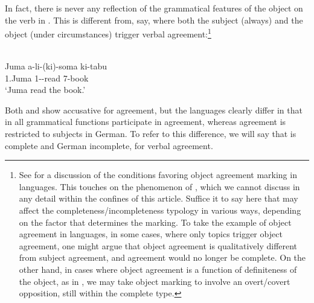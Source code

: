 \documentclass[output=paper]{langsci/langscibook}
\begin{document}
In fact, there is never any reflection of the grammatical features of the
object on the verb in . This is different from, say, 
where both the subject (always) and the object (under circumstances) trigger
verbal agreement:\footnote{See \citet[235--236]{Creissels2000} for a discussion
    of the conditions favoring object agreement
    marking in  languages. This touches on the phenomenon of
    , which we cannot discuss in any detail
    within the confines of this article. Suffice it to say here that
     may affect the
    completeness/incompleteness typology in various ways, depending on the
    factor that determines the marking. To take the example of object
    agreement in  languages, in some
    cases, where only topics trigger object
    agreement, one
    might argue that object agreement is
    qualitatively different from subject agreement, and agreement would no longer be complete. On the other hand, in
    cases where object agreement is a function
    of definiteness of the object, as in , we may take object
marking to involve an overt/covert opposition, still within the complete
type.}\newpage

\ea%
    \label{ex:11.5} \parencite[18]{Barrett-Keach1980}\\
    \gll Juma    a-li-(ki)-soma  ki-tabu\\
        1.Juma  1--read    7-book\\
    \glt ‘Juma read the book.’
\z

Both  and  show accusative  for
agreement, but the languages clearly differ in that in  all
grammatical functions participate in agreement, whereas agreement is restricted
to subjects in German. To refer to this difference, we will say that
 is complete and German incomplete, for verbal agreement.
\end{document}
